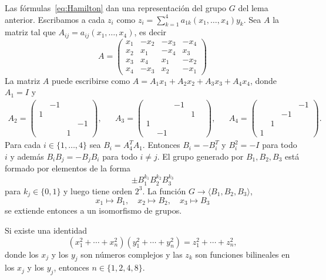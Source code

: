 \begin{example}
	Las fórmulas~\eqref{eq:Hamilton} dan una representación del grupo $G$ del
	lema anterior. Escribamos a cada $z_i$ como
	$z_i=\sum_{k=1}^4a_{1k}(x_1,\dots,x_4)y_k$. Sea $A$ la matriz tal que
	$A_{ij}=a_{ij}(x_1,\dots,x_4)$, es decir
	\[
		A=\begin{pmatrix}
			x_1 & -x_2 & -x_3 & -x_4\\
			x_2 & x_1 & -x_4 & x_3\\
			x_3 & x_4 & x_1 & -x_2\\
			x_4 & -x_3 & x_2 & -x_1
		\end{pmatrix}
	\]
	La matriz $A$ puede escribirse como $A=A_1x_1+A_2x_2+A_3x_3+A_4x_4$, donde $A_1=I$ y 
	\begin{align*}
		A_2=\begin{pmatrix}
			& -1\\
			1 \\
			&&&-1\\
			&&1
		\end{pmatrix},
		&&
		A_3=\begin{pmatrix}
			&& -1 \\
			&&&1 & \\
			1\\
			&-1
		  \end{pmatrix},
		  &&
		  A_4=\begin{pmatrix}
			&&&-1\\
			&&-1\\
			&1\\
			1
		\end{pmatrix}.
	\end{align*}
	Para cada $i\in\{1,\dots,4\}$ sea $B_i=A_4^TA_1$. Entonces $B_i=-B_i^T$ y $B_i^2=-I$ 
	para todo $i$ y además $B_iB_j=-B_jB_i$ para todo $i\ne j$. 
	El grupo generado por $B_1,B_2,B_3$ está formado por elementos de la forma
	\[
		\pm B_1^{k_1}B_2^{k_2}B_3^{k_3}
	\]
	para $k_j\in\{0,1\}$ y luego tiene orden $2^3$. 
	La función 
	$G\to\langle B_1,B_2,B_3\rangle$,
	\[
		x_1\mapsto B_1,\quad
		x_2\mapsto B_2,\quad
		x_3\mapsto B_3 
	\]
	se extiende entonces a un isomorfismo de grupos.
\end{example}

\begin{theorem}[Hurwitz]
	Si existe una identidad 
	\begin{equation}
		\label{eq:Hurwitz}
		(x_1^2+\cdots+x_n^2)(y_1^2+\cdots+y_n^2)=z_1^2+\cdots+z_n^2,
	\end{equation}
	donde los $x_j$ y los $y_j$ son números complejos y las $z_k$ son funciones
	bilineales en los $x_j$ y los $y_j$, entonces $n\in\{1,2,4,8\}$.
\end{theorem}

